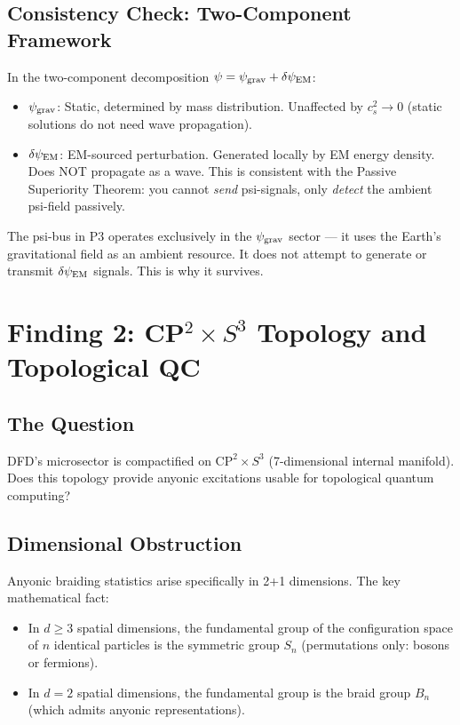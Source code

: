\documentclass[11pt]{article}
\theoremstyle{definition}
\theoremstyle{remark}
\newcommand{\psigrav}{\psi_{\rm grav}}
\newcommand{\dpsiEM}{\delta\psi_{\rm EM}}
\begin{document}
\subsection{Consistency Check: Two-Component Framework}

In the two-component decomposition $\psi = \psigrav + \dpsiEM$:
\begin{itemize}
  \item $\psigrav$: Static, determined by mass distribution.  Unaffected by
    $c_s^2 \to 0$ (static solutions do not need wave propagation).
  \item $\dpsiEM$: EM-sourced perturbation.  Generated locally by EM energy
    density.  Does NOT propagate as a wave.  This is consistent with the
    Passive Superiority Theorem: you cannot \emph{send} psi-signals, only
    \emph{detect} the ambient psi-field passively.
\end{itemize}

The psi-bus in P3 operates exclusively in the $\psigrav$ sector --- it uses
the Earth's gravitational field as an ambient resource.  It does not attempt
to generate or transmit $\dpsiEM$ signals.  This is why it survives.

\section{Finding 2: CP$^2 \times S^3$ Topology and Topological QC}
\label{sec:cp2-tqc}

\subsection{The Question}

DFD's microsector is compactified on $\mathrm{CP}^2 \times S^3$ (7-dimensional
internal manifold).  Does this topology provide anyonic excitations usable for
topological quantum computing?

\subsection{Dimensional Obstruction}

Anyonic braiding statistics arise specifically in 2+1 dimensions.  The key
mathematical fact:
\begin{itemize}
  \item In $d \geq 3$ spatial dimensions, the fundamental group of the
    configuration space of $n$ identical particles is the symmetric group
    $S_n$ (permutations only: bosons or fermions).
  \item In $d = 2$ spatial dimensions, the fundamental group is the braid
    group $B_n$ (which admits anyonic representations).
\end{itemize}
\end{document}

